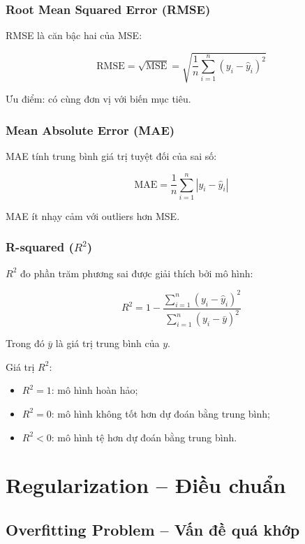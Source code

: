\subsubsection{Root Mean Squared Error (RMSE)}

RMSE là căn bậc hai của MSE:

\[
    \text{RMSE} = \sqrt{\text{MSE}} = \sqrt{\frac{1}{n}\sum_{i=1}^{n}(y_i - \hat{y}_i)^2}
\]

Ưu điểm: có cùng đơn vị với biến mục tiêu.

\subsubsection{Mean Absolute Error (MAE)}

MAE tính trung bình giá trị tuyệt đối của sai số:

\[
    \text{MAE} = \frac{1}{n}\sum_{i=1}^{n}|y_i - \hat{y}_i|
\]

MAE ít nhạy cảm với outliers hơn MSE.

\subsubsection{R-squared ($R^2$)}

$R^2$ đo phần trăm phương sai được giải thích bởi mô hình:

\[
    R^2 = 1 - \frac{\sum_{i=1}^{n}(y_i - \hat{y}_i)^2}{\sum_{i=1}^{n}(y_i - \bar{y})^2}
\]

Trong đó $\bar{y}$ là giá trị trung bình của $y$.

Giá trị $R^2$:
\begin{itemize}
    \item $R^2 = 1$: mô hình hoàn hảo;
    \item $R^2 = 0$: mô hình không tốt hơn dự đoán bằng trung bình;
    \item $R^2 < 0$: mô hình tệ hơn dự đoán bằng trung bình.
\end{itemize}

\section{Regularization -- Điều chuẩn}

\subsection{Overfitting Problem -- Vấn đề quá khớp}

